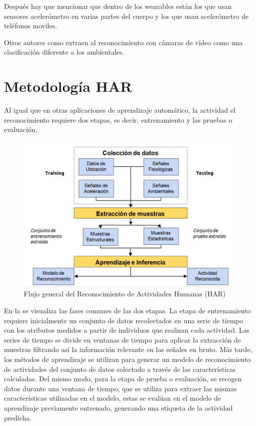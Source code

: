Después hay que mencionar que dentro de los wearables están los que usan sensores acelerómetro en varias partes del cuerpo y los que usan acelerómetro de teléfonos moviles.

Otros autores como \cite{karmul2010} extraen al reconocimiento con cámaras de vídeo como una clasificación diferente a los ambientales. 


\section{Metodología HAR}
Al igual que en otras aplicaciones de aprendizaje automático, la actividad el reconocimiento requiere dos etapas, es decir, entrenamiento y las pruebas o evaluación.

\begin{figure}[!htbp]
\centering
	\includegraphics[width=0.7\linewidth]{capitulo-2/graphics/harsystem}
	\caption[Flujo HAR]{Flujo general del Reconocimiento de Actividades Humanas (HAR)}
	\label{fig:harsystem}
\end{figure}

En la  se visualiza las fases comunes de las dos etapas. La etapa de entrenamiento requiere inicialmente un conjunto de datos recolectados en una serie de tiempo con los atributos medidos a partir de individuos que realizan cada actividad. Las series de tiempo se divide en ventanas de tiempo para aplicar la extracción de muestras filtrando así la información relevante en las señales en bruto. Más tarde, los métodos de aprendizaje se utilizan para generar un modelo de reconocimiento de actividades del conjunto de datos colectado a través de las características calculadas. Del mismo modo, para la etapa de prueba o evaluación, se recogen datos durante una ventana de tiempo, que se utiliza para extraer las mismas características utilizadas en el modelo,  estas se evalúan en el modelo de aprendizaje previamente  entrenado, generando una etiqueta de la actividad predicha.

